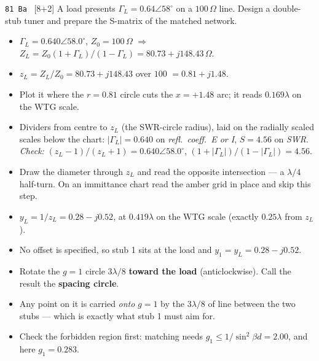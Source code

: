 \begin{asked}{\texttt{81 Ba} \ [8+2]}
A load presents $\Gamma_L = 0.64\angle 58^\circ$ on a $100\,\Omega$ line. Design a double-stub tuner and prepare the S-matrix of the matched network.
\end{asked}
\begin{itemize}
  \item $\Gamma_L = 0.640\angle 58.0^\circ$, $Z_0 = 100\,\Omega$ $\Rightarrow$ $Z_L = Z_0(1+\Gamma_L)/(1-\Gamma_L) = 80.73 + j148.43\,\Omega$.
\end{itemize}
\begin{itemize}
  \item $z_L = Z_L/Z_0 = 80.73 + j148.43$ over $100$ $=0.81 + j1.48$.
  \item Plot it where the $r = 0.81$ circle cuts the $x = +1.48$ arc; it reads $0.169\lambda$ on the WTG scale.
  \item Dividers from centre to $z_L$ (the SWR-circle radius), laid on the radially scaled scales below the chart: $|\Gamma_L| = 0.640$ on \emph{refl.\ coeff.\ E or I}, $S = 4.56$ on \emph{SWR}. \textit{Check:} $(z_L-1)/(z_L+1) = 0.640\angle 58.0^\circ$, $(1+|\Gamma_L|)/(1-|\Gamma_L|) = 4.56$.
\end{itemize}
\begin{itemize}
  \item Draw the diameter through $z_L$ and read the opposite intersection --- a $\lambda/4$ half-turn. On an immittance chart read the amber grid in place and skip this step.
  \item $y_L = 1/z_L = 0.28 - j0.52$, at $0.419\lambda$ on the WTG scale (exactly $0.25\lambda$ from $z_L$).
\end{itemize}
\begin{itemize}
  \item No offset is specified, so stub 1 sits at the load and $y_1 = y_L = 0.28 - j0.52$.
\end{itemize}
\begin{itemize}
  \item Rotate the $g=1$ circle $3\lambda/8$ \textbf{toward the load} (anticlockwise). Call the result the \textbf{spacing circle}.
  \item Any point on it is carried \emph{onto} $g=1$ by the $3\lambda/8$ of line between the two stubs --- which is exactly what stub 1 must aim for.
  \item Check the forbidden region first: matching needs $g_1 \le 1/\sin^2\beta d = 2.00$, and here $g_1 = 0.283$. \checkmark
\end{itemize}
